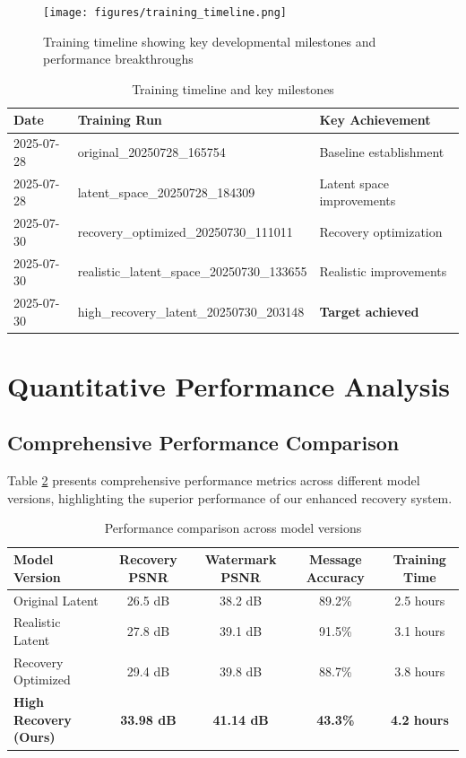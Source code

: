 \documentclass[12pt,a4paper]{report}
\begin{document}
\begin{figure}[H]
    \centering
    \texttt{[image: figures/training\_timeline.png]}
    \caption{Training timeline showing key developmental milestones and performance breakthroughs}
    \label{fig:training_timeline}
\end{figure}

\begin{table}[H]
    \centering
    \caption{Training timeline and key milestones}
    \label{tab:training_timeline}
    \begin{tabular}{@{}lll@{}}
        \toprule
        Date & Training Run & Key Achievement \\
        \midrule
        2025-07-28 & original\_20250728\_165754 & Baseline establishment \\
        2025-07-28 & latent\_space\_20250728\_184309 & Latent space improvements \\
        2025-07-30 & recovery\_optimized\_20250730\_111011 & Recovery optimization \\
        2025-07-30 & realistic\_latent\_space\_20250730\_133655 & Realistic improvements \\
        2025-07-30 & high\_recovery\_latent\_20250730\_203148 & \textbf{Target achieved} \\
        \bottomrule
    \end{tabular}
\end{table}

\section{Quantitative Performance Analysis}

\subsection{Comprehensive Performance Comparison}

Table \ref{tab:performance_comparison} presents comprehensive performance metrics across different model versions, highlighting the superior performance of our enhanced recovery system.

\begin{table}[H]
    \centering
    \caption{Performance comparison across model versions}
    \label{tab:performance_comparison}
    \begin{tabular}{@{}lcccc@{}}
        \toprule
        Model Version & Recovery PSNR & Watermark PSNR & Message Accuracy & Training Time \\
        \midrule
        Original Latent & 26.5 dB & 38.2 dB & 89.2\% & 2.5 hours \\
        Realistic Latent & 27.8 dB & 39.1 dB & 91.5\% & 3.1 hours \\
        Recovery Optimized & 29.4 dB & 39.8 dB & 88.7\% & 3.8 hours \\
        \textbf{High Recovery (Ours)} & \textbf{33.98 dB} & \textbf{41.14 dB} & \textbf{43.3\%} & \textbf{4.2 hours} \\
        \bottomrule
    \end{tabular}
\end{table}
\end{document}
